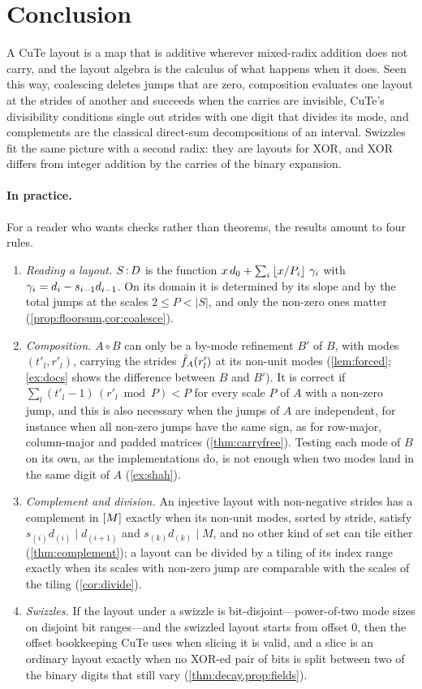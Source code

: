 \section{Conclusion}\label{sec:conclusion}

A CuTe layout is a map that is additive wherever mixed-radix addition does not carry, and the
layout algebra is the calculus of what happens when it does. Seen this way, coalescing deletes
jumps that are zero, composition evaluates one layout at the strides of another and succeeds when
the carries are invisible, CuTe's divisibility conditions single out strides with one digit that
divides its mode, and complements are the classical direct-sum decompositions of an interval. Swizzles fit
the same picture with a second radix: they are layouts for XOR, and XOR differs from integer
addition by the carries of the binary expansion.

\paragraph{In practice.}
For a reader who wants checks rather than theorems, the results amount to four rules.
\begin{enumerate}[leftmargin=1.6em,itemsep=2pt]
\item \emph{Reading a layout.} $S\,{:}\,D$ is the function $x\,d_0+\sum_i\left\lfloor x/P_i \right\rfloor\,\gamma_i$ with
 $\gamma_i=d_i-s_{i-1}d_{i-1}$. On its domain it is determined by its slope and by the total jumps
 at the scales $2\le P<|S|$, and only the non-zero ones matter
 (\cref{prop:floorsum,cor:coalesce}).
\item \emph{Composition.} $A\circ B$ can only be a by-mode refinement $B'$ of $B$, with modes
 $(t'_l,r'_l)$, carrying the strides $\hat{f}_{A}(r'_l)$ at its non-unit modes (\cref{lem:forced};
 \cref{ex:docs} shows the difference between $B$ and $B'$). It is correct if
 $\sum_l(t'_l-1)\,(r'_l\bmod P)<P$ for every scale $P$ of $A$ with a non-zero jump, and this is
 also necessary when the jumps of $A$ are independent, for instance when all non-zero jumps have
 the same sign, as for row-major, column-major and padded matrices (\cref{thm:carryfree}).
 Testing each mode of $B$ on its own, as the implementations do, is not enough when two modes
 land in the same digit of $A$ (\cref{ex:shah}).
\item \emph{Complement and division.} An injective layout with non-negative strides has a
 complement in $[M]$ exactly when its non-unit modes, sorted by stride, satisfy
 $s_{(i)}d_{(i)}\mid d_{(i+1)}$ and $s_{(k)}d_{(k)}\mid M$, and no other kind of set can tile
 either (\cref{thm:complement}); a layout can be divided by a tiling of its index range exactly
 when its scales with non-zero jump are comparable with the scales of the tiling
 (\cref{cor:divide}).
\item \emph{Swizzles.} If the layout under a swizzle is bit-disjoint---power-of-two mode sizes on
 disjoint bit ranges---and the swizzled layout starts from offset $0$, then the offset bookkeeping
 CuTe uses when slicing it is valid, and a slice is an ordinary layout exactly when no XOR-ed pair
 of bits is split between two of the binary digits that still vary
 (\cref{thm:decay,prop:fields}).
\end{enumerate}


